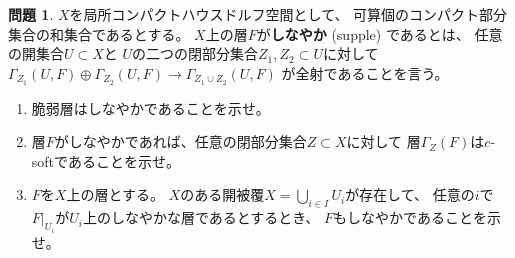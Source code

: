 \documentclass[uplatex,dvipdfmx]{jsarticle}
\theoremstyle{definition}
\newtheorem{prob}[prob]{問題}
\begin{document}
\begin{prob}\label{2.8}
  \(X\)を局所コンパクトハウスドルフ空間として、
  可算個のコンパクト部分集合の和集合であるとする。
  \(X\)上の層\(F\)が\textbf{しなやか} (supple) であるとは、
  任意の開集合\(U\subset X\)と
  \(U\)の二つの閉部分集合\(Z_1,Z_2\subset U\)に対して
  \(\Gamma_{Z_1}(U,F) \oplus \Gamma_{Z_2}(U,F) \to \Gamma_{Z_1\cup Z_2}(U,F)\)
  が全射であることを言う。
  \begin{enumerate}
    \item \label{2.8.1}
    脆弱層はしなやかであることを示せ。
    \item \label{2.8.2}
    層\(F\)がしなやかであれば、任意の閉部分集合\(Z\subset X\)に対して
    層\(\Gamma_Z(F)\)は\(c\)-softであることを示せ。
    \item \label{2.8.3}
    \(F\)を\(X\)上の層とする。
    \(X\)のある開被覆\(X=\bigcup_{i\in I}U_i\)が存在して、
    任意の\(i\)で\(F|_{U_i}\)が\(U_i\)上のしなやかな層であるとするとき、
    \(F\)もしなやかであることを示せ。
  \end{enumerate}
\end{prob}
\end{document}
